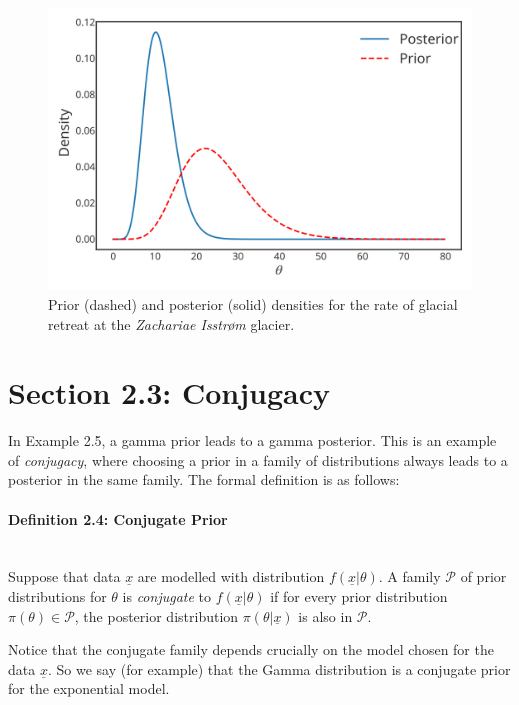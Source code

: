 {\begin{figure}[h]

\includegraphics{images/glacier_posterior.svg}
\caption{Prior (dashed) and posterior (solid) densities for the rate of glacial retreat at the \textit{Zachariae Isstr\o m} glacier.}

\end{figure}}


\section{Section 2.3: Conjugacy}

In Example 2.5, a gamma prior leads to a gamma posterior.
This is an example of {\it conjugacy}, where choosing a prior in a family of distributions
always leads to a posterior in the same family.
The formal definition is as follows:

\paragraph{Definition 2.4: Conjugate Prior}{~\\
Suppose that data $\underline{x}$ are modelled with distribution
$f(\underline{x}|\theta)$. A family $\mathcal{P}$ of prior distributions for
$\theta$ is \emph{conjugate} to $f(\underline{x}|\theta)$ if
for every prior distribution $\pi(\theta)\in\mathcal{P}$, the
posterior distribution $\pi(\theta|\underline{x})$ is also in $\mathcal{P}$.}

Notice that the conjugate family depends crucially on the model chosen
for the data $\underline{x}$. So we say (for example) that the Gamma distribution
is a conjugate prior for the exponential model.

